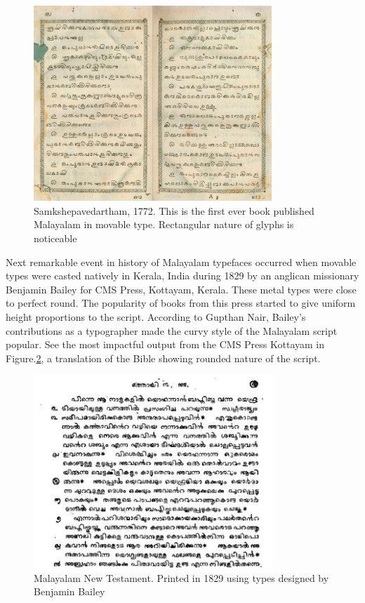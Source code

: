 \documentclass[11pt,twoside,a4paper,parskip=half]{scrartcl}
\begin{document}
\begin{figure}[h!]
	\includegraphics[width=0.8\textwidth]{images/samkshepavedartham1772.png}
	\caption{Samkshepavedartham, 1772. This is the first ever book published Malayalam in movable type. Rectangular nature of glyphs is noticeable}
	\label{Samkshepam}
\end{figure} 

Next remarkable event in history of Malayalam typefaces occurred when movable types were casted natively in Kerala, India during 1829 by an anglican missionary Benjamin Bailey\cite{babucherian} for CMS Press, Kottayam, Kerala. These metal types were close to perfect round. The popularity of books from this press started to give uniform height proportions to the script. According to Gupthan Nair, Bailey's contributions as a typographer made the curvy style of the Malayalam script popular\cite{gupthannair}. See the most impactful output from the CMS Press Kottayam in Figure.\ref{newtestament}, a translation of the Bible showing rounded nature of the script.


\begin{figure}[h!]
	\includegraphics[width=0.8\textwidth]{images/newtestament1829.png}
	\caption{Malayalam New Testament. Printed in 1829 using types designed by Benjamin Bailey }
	\label{newtestament}
\end{figure}
\end{document}
